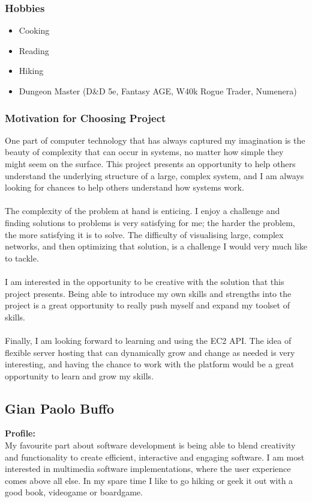 \documentclass{article}
\begin{document}
\subsubsection{Hobbies}
\begin{itemize}
	\item Cooking
	\item Reading
	\item Hiking
	\item Dungeon Master (D\&D 5e, Fantasy AGE, W40k Rogue Trader, Numenera)
\end{itemize}
\subsubsection{Motivation for Choosing Project}
One part of computer technology that has always captured my imagination is the beauty of complexity that can occur in systems, no matter how simple they might seem on the surface. This project presents an opportunity to help others understand the underlying structure of a large, complex system, and I am always looking for chances to help others understand how systems work.
\\\\		
The complexity of the problem at hand is enticing. I enjoy a challenge and finding solutions to problems is very satisfying for me; the harder the problem, the more satisfying it is to solve. The difficulty of visualising large, complex networks, and then optimizing that solution, is a challenge I would very much like to tackle.
\\\\			
I am interested in the opportunity to be creative with the solution that this project presents. Being able to introduce my own skills and strengths into the project is a great opportunity to really push myself and expand my toolset of skills.
\\\\			
Finally, I am looking forward to learning and using the EC2 API. The idea of flexible server hosting that can dynamically grow and change as needed is very interesting, and having the chance to work with the platform would be a great opportunity to learn and grow my skills.

\cleardoublepage	

\subsection{Gian Paolo Buffo}
\textbf{Profile:}\\
My favourite part about software development is being able to blend creativity and functionality to create efficient, interactive and engaging software. I am most interested in multimedia software implementations, where the user experience comes above all else. In my spare time I like to go hiking or geek it out with a good book, videogame or boardgame.  
\end{document}

